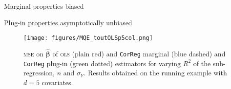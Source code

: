 \documentclass[11pt]{beamer}
\begin{document}
		\begin{frame}{Marginal properties}
		biased
		\end{frame}
		\begin{frame}{Plug-in properties}
		asymptotically unbiased
		\end{frame}
		\begin{frame}
		\begin{figure}[h!]
\centering
	\texttt{[image: figures/MQE\_toutOLSp5col.png]}
	\caption{\textsc{mse} on $\hat{\boldsymbol{\beta}}$ of \textsc{ols} (plain red) and {\tt CorReg} marginal (blue dashed) and {\tt CorReg} plug-in (green dotted) estimators for varying $R^2$ of the sub-regression, $n$ and $\sigma_Y$. Results obtained on the running example with $d=5$ covariates.}\label{MQE2}
\end{figure}
		\end{frame}
		
\end{document}
